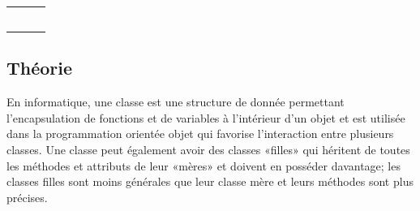 \documentclass[]{report}
\begin{document}
\begin{adjustwidth}{1.5cm}{0cm}
\begin{center}
\begin{tabular}{ccc} 
 & & \\  
\\  
 & & \\  
\\  
 & &  \\  
\end{tabular}
\end{center}

\subsection*{\Large{Théorie}}
\vspace{-5mm}\makebox[0.917\textwidth]{\hrulefill}\vspace{3mm}

En informatique, une classe est une structure de donnée permettant l'encapsulation de fonctions et de variables à l'intérieur d'un objet et est utilisée dans la programmation orientée objet qui favorise l'interaction entre plusieurs classes. Une classe peut également avoir des classes «filles» qui héritent de toutes les méthodes et attributs de leur «mères» et doivent en posséder davantage; les classes filles sont moins générales que leur classe mère et leurs méthodes sont plus précises.
\\


\end{adjustwidth}
\end{document}
